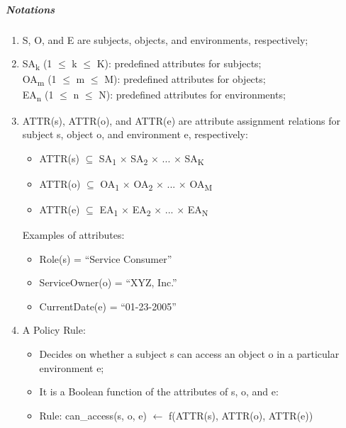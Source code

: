 \documentclass{article}
\begin{document}
            \subparagraph{Notations}

            \begin{enumerate}
                \item S, O, and E are subjects, objects, and environments, respectively;
                \item SA\textsubscript{k} (1 $\leq$ k $\leq$ K): predefined attributes for subjects; \\
                      OA\textsubscript{m} (1 $\leq$ m $\leq$ M): predefined attributes for objects; \\
                      EA\textsubscript{n} (1 $\leq$ n $\leq$ N): predefined attributes for environments;
                \item ATTR(s), ATTR(o), and ATTR(e) are attribute assignment relations for subject s, object o, and environment e, respectively:
                    \begin{itemize}
                        \item ATTR(s) $\subseteq$ SA\textsubscript{1} $\times$ SA\textsubscript{2} $\times$ ... $\times$ SA\textsubscript{K}
                        \item ATTR(o) $\subseteq$ OA\textsubscript{1} $\times$ OA\textsubscript{2} $\times$ ... $\times$ OA\textsubscript{M}
                        \item ATTR(e) $\subseteq$ EA\textsubscript{1} $\times$ EA\textsubscript{2} $\times$ ... $\times$ EA\textsubscript{N}
                    \end{itemize}
                    Examples of attributes:
                    \begin{itemize}
                        \item Role(s) = “Service Consumer”
                        \item ServiceOwner(o) = “XYZ, Inc.”
                        \item CurrentDate(e) = “01-23-2005”
                    \end{itemize}
                \item A Policy Rule:
                    \begin{itemize}
                        \item Decides on whether a subject s can access an object o in a particular environment e;
                        \item It is a Boolean function of the attributes of s, o, and e:
                        \item Rule: can\_access(s, o, e) $\leftarrow$ f(ATTR(s), ATTR(o), ATTR(e))

\end{itemize}
\end{enumerate}
\end{document}

